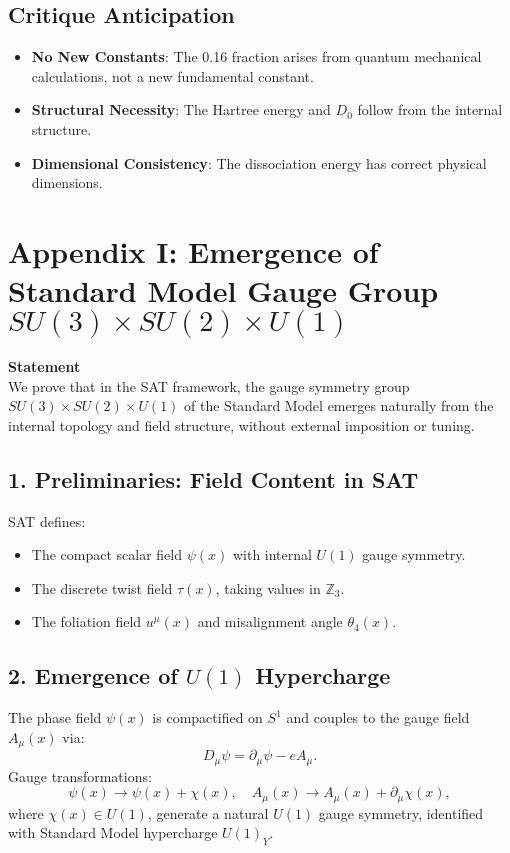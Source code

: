 \documentclass[12pt]{article}
\begin{document}
\subsection*{Critique Anticipation}
\begin{itemize}
    \item \textbf{No New Constants}: The 0.16 fraction arises from quantum mechanical calculations, not a new fundamental constant.
    \item \textbf{Structural Necessity}: The Hartree energy and \(D_0\) follow from the internal structure.
    \item \textbf{Dimensional Consistency}: The dissociation energy has correct physical dimensions.
\end{itemize}

\newpage
\section*{Appendix I: Emergence of Standard Model Gauge Group \(SU(3) \times SU(2) \times U(1)\)}

\textbf{Statement} \\
We prove that in the SAT framework, the gauge symmetry group \(SU(3) \times SU(2) \times U(1)\) of the Standard Model emerges naturally from the internal topology and field structure, without external imposition or tuning.

\subsection*{1. Preliminaries: Field Content in SAT}
SAT defines:
\begin{itemize}
    \item The compact scalar field \(\psi(x)\) with internal \(U(1)\) gauge symmetry.
    \item The discrete twist field \(\tau(x)\), taking values in \(\mathbb{Z}_3\).
    \item The foliation field \(u^\mu(x)\) and misalignment angle \(\theta_4(x)\).
\end{itemize}

\subsection*{2. Emergence of \(U(1)\) Hypercharge}
The phase field \(\psi(x)\) is compactified on \(S^1\) and couples to the gauge field \(A_\mu(x)\) via:
\[
D_\mu \psi = \partial_\mu \psi - e A_\mu.
\]
Gauge transformations:
\[
\psi(x) \to \psi(x) + \chi(x), \quad A_\mu(x) \to A_\mu(x) + \partial_\mu \chi(x),
\]
where \(\chi(x) \in U(1)\), generate a natural \(U(1)\) gauge symmetry, identified with Standard Model hypercharge \(U(1)_Y\).
\end{document}
